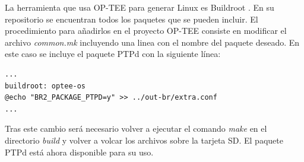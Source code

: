 La herramienta que usa OP-TEE para generar Linux es Buildroot \cite{buildroot}. En su repositorio se encuentran todos los paquetes que se pueden incluir. El procedimiento para añadirlos en el proyecto OP-TEE consiste en modificar el archivo \textit{common.mk} incluyendo una linea con el nombre del paquete deseado. En este caso se incluye el paquete PTPd con la siguiente línea:


\begin{lstlisting}
...
buildroot: optee-os
@echo "BR2_PACKAGE_PTPD=y" >> ../out-br/extra.conf
...
\end{lstlisting}

Tras este cambio será necesario volver a ejecutar el comando \textit{make} en el directorio \textit{build} y volver a volcar los archivos sobre la tarjeta SD. El paquete PTPd está ahora disponible para su uso. 